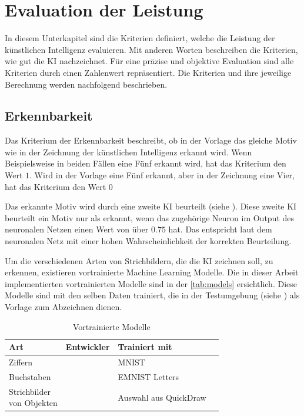 \section{Evaluation der Leistung}\label{chap:m_eval}
In diesem Unterkapitel sind die Kriterien definiert, welche die Leistung der
künstlichen Intelligenz evaluieren. Mit anderen Worten beschreiben die
Kriterien, wie gut die KI nachzeichnet. Für eine präzise und objektive
Evaluation sind alle Kriterien durch einen Zahlenwert repräsentiert. Die
Kriterien und ihre jeweilige Berechnung werden nachfolgend beschrieben.

\subsection{Erkennbarkeit}\label{sub:m_eval_rec}
Das Kriterium der Erkennbarkeit beschreibt, ob in der Vorlage das gleiche Motiv
wie in der Zeichnung der künstlichen Intelligenz erkannt wird. Wenn
Beispielsweise in beiden Fällen eine Fünf erkannt wird, hat das Kriterium den
Wert $1$. Wird in der Vorlage eine Fünf erkannt, aber in der Zeichnung eine
Vier, hat das Kriterium den Wert $0$

Das erkannte Motiv wird durch eine zweite KI beurteilt (siehe
). Diese zweite KI beurteilt ein Motiv nur als erkannt,
wenn das zugehörige Neuron im Output des neuronalen Netzen einen Wert von über
$0.75$ hat. Das entspricht laut dem neuronalen Netz mit einer hohen
Wahrscheinlichkeit der korrekten Beurteilung.

Um die verschiedenen Arten von Strichbildern, die die KI zeichnen soll, zu
erkennen, existieren vortrainierte Machine Learning Modelle. Die in dieser
Arbeit implementierten vortrainierten Modelle sind in der \autoref{tab:models}
ersichtlich. Diese Modelle sind mit den selben Daten trainiert, die in der
Testumgebung (siehe ) als Vorlage zum Abzeichnen
dienen.

\begin{table}[!ht]
  \centering
  \begin{tabular}{|l|l|l|l|}
  \hline
      Art & Entwickler & Trainiert mit \\ \hline
      Ziffern & \cite{mazzia__2022} & MNIST \\ \hline
      Buchstaben & \cite{mor_emnist_2022} & EMNIST Letters \\ \hline
      \makecell{Strichbilder\\von Objekten} & \cite{lam_linus_keras_2022} & Auswahl aus QuickDraw \\ \hline
  \end{tabular}
  \caption{Vortrainierte Modelle}
  \label{tab:models}
\end{table}

